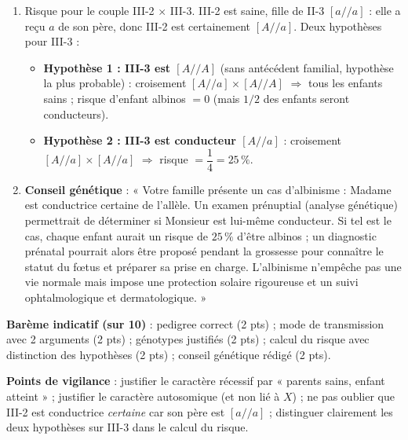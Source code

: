 \documentclass[11pt]{article}
\newcommand{\cle}[1]{{\popxbold\color{popdark}#1}}
\begin{document}
\begin{corrige}
\begin{enumerate}
\begin{itemize}
\item II-3 est albinos : $[a//a]$ (génotype certain).
\item I-1 et I-2 sont sains mais ont un fils $[a//a]$ : chacun a fourni un allèle $a$ $\Rightarrow$ I-1 : $[A//a]$, I-2 : $[A//a]$ (conducteurs).
\item II-4 est saine mais son père était albinos $[a//a]$ : elle a obligatoirement reçu $a$ de lui $\Rightarrow$ II-4 : $[A//a]$ (conductrice).
\end{itemize}
\item Risque pour le couple III-2 $\times$ III-3. III-2 est saine, fille de II-3 $[a//a]$ : elle a reçu $a$ de son père, donc III-2 est certainement $[A//a]$. Deux hypothèses pour III-3 :
\begin{itemize}
\item \textbf{Hypothèse 1 : III-3 est $[A//A]$} (sans antécédent familial, hypothèse la plus probable) : croisement $[A//a]\times[A//A]$ $\Rightarrow$ tous les enfants sains ; risque d'enfant albinos $=0$ (mais $1/2$ des enfants seront conducteurs).
\item \textbf{Hypothèse 2 : III-3 est conducteur $[A//a]$} : croisement $[A//a]\times[A//a]$ $\Rightarrow$ risque $=\dfrac{1}{4}=25\,\%$.
\end{itemize}
\item \textbf{Conseil génétique} : « Votre famille présente un cas d'albinisme : Madame est conductrice certaine de l'allèle. Un \cle{examen prénuptial} (analyse génétique) permettrait de déterminer si Monsieur est lui-même conducteur. Si tel est le cas, chaque enfant aurait un risque de $25\,\%$ d'être albinos ; un \cle{diagnostic prénatal} pourrait alors être proposé pendant la grossesse pour connaître le statut du fœtus et préparer sa prise en charge. L'albinisme n'empêche pas une vie normale mais impose une protection solaire rigoureuse et un suivi ophtalmologique et dermatologique. »
\end{enumerate}
\textbf{Barème indicatif (sur 10)} : pedigree correct (2 pts) ; mode de transmission avec 2 arguments (2 pts) ; génotypes justifiés (2 pts) ; calcul du risque avec distinction des hypothèses (2 pts) ; conseil génétique rédigé (2 pts).\par
\textbf{Points de vigilance} : justifier le caractère récessif par « parents sains, enfant atteint » ; justifier le caractère autosomique (et non lié à $X$) ; ne pas oublier que III-2 est conductrice \emph{certaine} car son père est $[a//a]$ ; distinguer clairement les deux hypothèses sur III-3 dans le calcul du risque.
\end{corrige}
\end{document}

